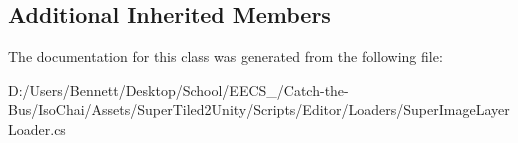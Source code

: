 \subsection*{Additional Inherited Members}


The documentation for this class was generated from the following file\+:\begin{DoxyCompactItemize}
\item 
D\+:/\+Users/\+Bennett/\+Desktop/\+School/\+E\+E\+C\+S\+\_/\+Catch-\/the-\/\+Bus/\+Iso\+Chai/\+Assets/\+Super\+Tiled2\+Unity/\+Scripts/\+Editor/\+Loaders/Super\+Image\+Layer\+Loader.\+cs\end{DoxyCompactItemize}

